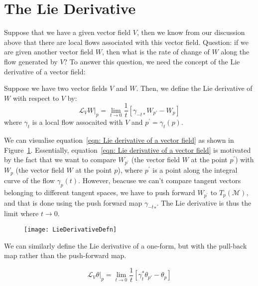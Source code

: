   \section{The Lie Derivative}
    Suppose that we have a given vector field $V$, then we know from our
    discussion above that there are local flows associated with this vector
    field. Question: if we are given another vector field $W$, then what is
    the rate of change of $W$ along the flow generated by $V$? To answer this
    question, we need the concept of the Lie derivative of a vector field:
    \begin{definition}
      Suppose we have two vector fields $V$ and $W$. Then, we define the Lie
      derivative of $W$ with respect to $V$ by:
      \begin{equation}
        \label{eqn: Lie derivative of a vector field}
        \mathcal{L}_{V}W\bigr|_{p} = \lim_{t \rightarrow 0
        }\frac{1}{t}\left[\gamma_{-t*}W_{p'} - W_p\right]
      \end{equation}
      where $\gamma_t$ is a local flow assocaited with $V$ and $p^\prime =
      \gamma_t(p)$.
    \end{definition}
    \begin{remark}
      We can visualise equation~\ref{eqn: Lie derivative of a vector field}
      as shown in Figure~\ref{fig: Lie derivative Definition}. Essentially,
      equation~\ref{eqn: Lie derivative of a vector field} is motivated by
      the fact that we want to compare $W_{p^\prime}$ (the vector field $W$
      at the point $p^\prime$) with $W_p$ (the vector field $W$ at the point
      $p$), where $p^\prime$ is a point along the integral curve of the flow
      $\gamma_p(t)$. However, beacuse we can't compare tangent vectors
      belonging to different tangent spaces, we have to push forward
      $W_{p^\prime}$ to $T_p(\mathcal{M})$, and that is done using the push
      forward map ${\gamma_{-t}}_*$. The Lie derivative is thus the limit
      where $t \to 0$.
      \begin{figure}
        \centering
        \texttt{[image: LieDerivativeDefn]}
        \caption[]{}
        \label{fig: Lie derivative Definition}
      \end{figure}
    \end{remark}
    We can similarly define the Lie derivative of a one-form, but with the
    pull-back map rather than the push-forward map.
    \begin{definition}
      \begin{equation}
      \label{eqn: Lie derivative of a one-form}
        \mathcal{L}_{V}\theta\bigr|_{p} = \lim_{t \rightarrow 0
        }\frac{1}{t}\left[\gamma_t^{*} \theta _{p'} - \theta_p\right]
      \end{equation}
    \end{definition}
